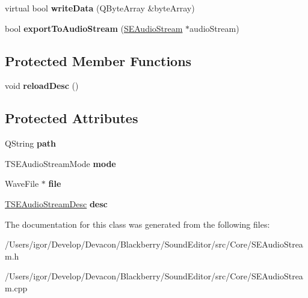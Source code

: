 \begin{DoxyCompactItemize}
\item 
\hypertarget{class_s_e_audio_stream_aecda3096d9dca88eca934a2a555ad0ff}{virtual bool {\bfseries write\+Data} (Q\+Byte\+Array \&byte\+Array)}\label{class_s_e_audio_stream_aecda3096d9dca88eca934a2a555ad0ff}

\item 
\hypertarget{class_s_e_audio_stream_ae8d33acef5174c832e229c61d1c5d75d}{bool {\bfseries export\+To\+Audio\+Stream} (\hyperlink{class_s_e_audio_stream}{S\+E\+Audio\+Stream} $\ast$audio\+Stream)}\label{class_s_e_audio_stream_ae8d33acef5174c832e229c61d1c5d75d}

\end{DoxyCompactItemize}
\subsection*{Protected Member Functions}
\begin{DoxyCompactItemize}
\item 
\hypertarget{class_s_e_audio_stream_a9e6533e1ca6a98463a208a6a668b0fcc}{void {\bfseries reload\+Desc} ()}\label{class_s_e_audio_stream_a9e6533e1ca6a98463a208a6a668b0fcc}

\end{DoxyCompactItemize}
\subsection*{Protected Attributes}
\begin{DoxyCompactItemize}
\item 
\hypertarget{class_s_e_audio_stream_aa0b683207a891441919b456b52ecc9af}{Q\+String {\bfseries path}}\label{class_s_e_audio_stream_aa0b683207a891441919b456b52ecc9af}

\item 
\hypertarget{class_s_e_audio_stream_afde89d08f02ae01b1e9be3905942fb31}{T\+S\+E\+Audio\+Stream\+Mode {\bfseries mode}}\label{class_s_e_audio_stream_afde89d08f02ae01b1e9be3905942fb31}

\item 
\hypertarget{class_s_e_audio_stream_a0c7455be26d6addadbeed52c78cf1d68}{Wave\+File $\ast$ {\bfseries file}}\label{class_s_e_audio_stream_a0c7455be26d6addadbeed52c78cf1d68}

\item 
\hypertarget{class_s_e_audio_stream_a689abf52d876db852fa8c28c3fbaec12}{\hyperlink{struct_t_s_e_audio_stream_desc}{T\+S\+E\+Audio\+Stream\+Desc} {\bfseries desc}}\label{class_s_e_audio_stream_a689abf52d876db852fa8c28c3fbaec12}

\end{DoxyCompactItemize}


The documentation for this class was generated from the following files\+:\begin{DoxyCompactItemize}
\item 
/\+Users/igor/\+Develop/\+Devacon/\+Blackberry/\+Sound\+Editor/src/\+Core/S\+E\+Audio\+Stream.\+h\item 
/\+Users/igor/\+Develop/\+Devacon/\+Blackberry/\+Sound\+Editor/src/\+Core/S\+E\+Audio\+Stream.\+cpp\end{DoxyCompactItemize}
